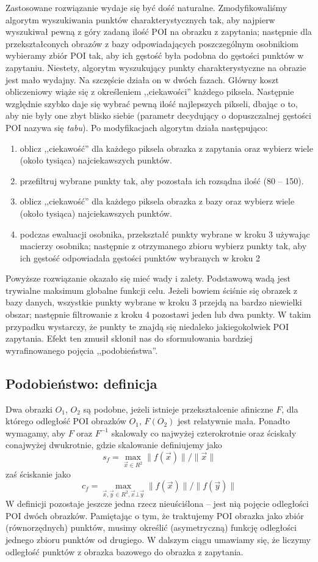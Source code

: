 \documentclass[a4paper,12pt,leqno]{article}
\begin{document}
Zastosowane rozwiązanie wydaje się być dość naturalne. Zmodyfikowaliśmy algorytm wyszukiwania punktów charakterystycznych tak, aby najpierw wyszukiwał pewną z góry zadaną ilość POI na 
obrazku z zapytania; następnie dla przekształconych obrazów z bazy odpowiadających poszczególnym osobnikiom wybieramy zbiór POI tak, aby ich gęstość była podobna do gęstości punktów w 
zapytaniu. Niestety, algorytm wyszukujący punkty charakterystyczne na obrazie jest mało wydajny. Na szczęście działa on w dwóch fazach. Główny koszt obliczeniowy wiąże się z 
określeniem ,,ciekawości'' każdego piksela. Następnie względnie szybko daje się wybrać pewną ilość najlepszych pikseli, dbając o to, aby nie były one zbyt blisko siebie (parametr decydujący o
dopuszczalnej gęstości POI nazywa się \textit{tabu}). Po modyfikacjach algorytm działa następująco:
\begin{enumerate}
 \item oblicz ,,ciekawość'' dla każdego piksela obrazka z zapytania oraz wybierz wiele (około tysiąca) najciekawszych punktów.
 \item przefiltruj wybrane punkty tak, aby pozostała ich rozsądna ilość (80 -- 150).
 \item oblicz ,,ciekawość'' dla każdego piksela obrazka z bazy oraz wybierz wiele (około tysiąca) najciekawszych punktów.
 \item podczas ewaluacji osobnika, przekształć punkty wybrane w kroku 3 używając macierzy osobnika;
       następnie z otrzymanego zbioru wybierz punkty tak, aby ich gęstość odpowiadała gęstości punktów wybranych w kroku 2
\end{enumerate}

Powyższe rozwiązanie okazało się mieć wady i zalety. Podstawową wadą jest trywialne maksimum globalne funkcji celu. Jeżeli bowiem ściśnie się obrazek z bazy danych, wszystkie punkty wybrane
w kroku 3 przejdą na bardzo niewielki obszar; następnie filtrowanie z kroku 4 pozostawi jeden lub dwa punkty. W takim przypadku wystarczy, że punkty te znajdą się niedaleko jakiegokolwiek
POI zapytania. Efekt ten zmusił skłonił nas do sformułowania bardziej wyrafinowanego pojęcia ,,podobieństwa''. 

\subsection{Podobieństwo: definicja}
Dwa obrazki $O_1$, $O_2$ są podobne, jeżeli istnieje przekształcenie afiniczne $F$, dla którego odległość POI obrazków $O_1$, $F(O_2)$ jest relatywnie mała.
Ponadto wymagamy, aby $F$ oraz $F^{-1}$ skalowały co najwyżej czterokrotnie oraz ściskały conajwyżej dwukrotnie, gdzie skalowanie definiujemy jako
\[ s_f = \max_{\vec x \in R^2} \| f(\vec x) \| / \| \vec x \| \]
zaś ściskanie jako
\[ c_f = \max_{\vec x, \vec y \in R^2, \vec x \bot \vec y} \| f(\vec x) \| / \| f(\vec y) \| \]
W definicji pozostaje jeszcze jedna rzecz nieuściślona -- jest nią pojęcie odległości POI dwóch obrazków. Pamiętając o tym, że traktujemy POI obrazka jako zbiór (równorzędnych) punktów, 
musimy określić (asymetryczną) funkcję odległości jednego zbioru punktów od drugiego.
W dalszym ciągu umawiamy się, że liczymy odległość punktów z obrazka bazowego do obrazka z zapytania.
\end{document}

